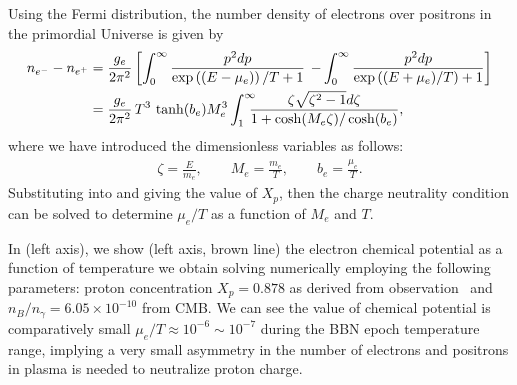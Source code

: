 Using the Fermi distribution, the number density of electrons over positrons in the primordial Universe is given by
\begin{align}\label{ee_density}
n_{e^-}-n_{{e^+}}&=\frac{g_e}{2\pi^2}\left[\int_0^\infty\frac{p^2dp}{\exp{\left((E-\mu_e)\right)/T}+1}\right.\left.-\int_0^\infty\frac{p^2dp}{\exp{\left((E+\mu_e)/T\right)}+1}\right]\notag\\
&=\frac{g_e}{2\pi^2}\,{T^3}\,\tanh(b_e)M_e^3\int_{1}^\infty \!\!\!\!\frac{ \zeta \sqrt{\zeta^2-1} d\zeta}{1+\cosh(M_e\zeta)/\cosh(b_e)},
\end{align}
where we have introduced the dimensionless variables as follows: 
\begin{align}\label{Variables}
\zeta=\frac{E}{m_e},\qquad M_e=\frac{m_e}{T},\qquad b_e=\frac{\mu_e}{T}.
\end{align}
Substituting  into  and giving the value of $X_p$, then the charge neutrality condition can be solved to determine $\mu_e/T$ as a function of $M_e$ and $T$. 


In  (left axis), we show (left axis, brown line) the electron chemical potential as a function of temperature we obtain solving  numerically employing the following parameters: proton concentration $X_p=0.878$ as derived from observation~\cite{ParticleDataGroup:2022pth} and $n_B/n_\gamma=6.05\times10^{-10}$ from CMB. We can see the value of chemical potential is comparatively small $\mu_e/T\approx10^{-6}\sim10^{-7}$ during the BBN epoch temperature range, implying a very small asymmetry in the number of electrons and positrons in plasma is needed to neutralize proton charge. 


